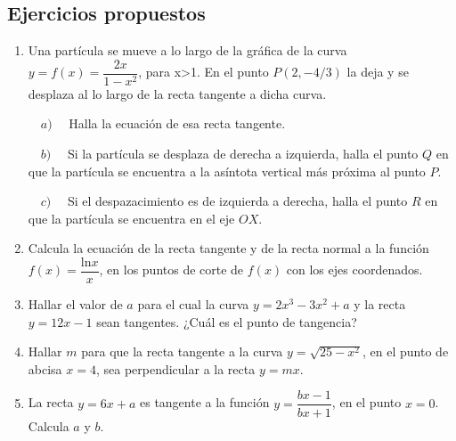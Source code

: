 	
	
	
\subsection{Ejercicios propuestos}

\begin{enumerate}

\item Una partícula se mueve a lo largo de la gráfica de la curva $y=f(x)=\dfrac {2x}{1-x^2}$, para x>1. En el punto $P(2,-4/3)$ la deja y se desplaza al lo largo de la recta tangente a dicha curva.

	$\quad a) \quad$ Halla la ecuación de esa recta tangente.
	
	$\quad b) \quad$ Si la partícula se desplaza de derecha a izquierda, halla el punto $Q$ en que la partícula se encuentra a la asíntota vertical más próxima al punto $P$.
	
	$\quad c) \quad$ Si el despazacimiento es de izquierda a derecha, halla el punto $R$ en que la partícula se encuentra en el eje $OX$.
	


	
\item Calcula la ecuación de la recta tangente y de la recta normal a la función $f(x)=\dfrac {\mathrm{ln}x}{x}$, en los puntos de corte de $f(x)$ con los ejes coordenados.

\rightline{\textcolor{gris}{$RT: \; y=x-1; \quad RN: \; y=-x+1$ }}

\item Hallar el valor de $a$ para el cual la curva $y=2x^3-3x^2+a$ y la recta $y=12x-1$ sean tangentes. ¿Cuál es el punto de tangencia?

\rightline{\textcolor{gris}{Solución: $a=-8; \quad (-1,-13); \quad \vee \quad a=19; \quad (2,23)$}}

\item Hallar $m$ para que la recta tangente a la curva $y=\sqrt{25-x^2}$, en el punto de abcisa $x=4$, sea perpendicular a la recta $y=mx$.

\rightline{\textcolor{gris}{Solución: $m=3/4$}}

\item La recta $y=6x+a$ es tangente a la función $y=\dfrac {bx-1}{bx+1}$, en el punto $x=0$. Calcula $a$ y $b$.


\end{enumerate}
